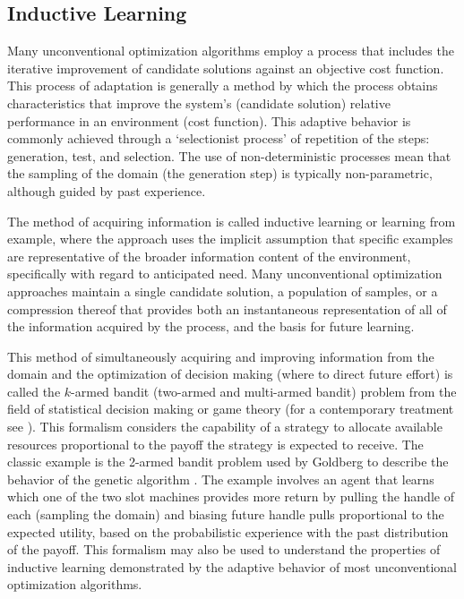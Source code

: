 \documentclass[a4paper, 11pt]{article}
\begin{document}
% 
% 
\subsection{Inductive Learning}
\label{subsec:induction}
Many unconventional optimization algorithms employ a process that includes the iterative improvement of candidate solutions against an objective cost function. This process of adaptation is generally a method by which the process obtains characteristics that improve the system's (candidate solution) relative performance in an environment (cost function). This adaptive behavior is commonly achieved through a `selectionist process' of repetition of the steps: generation, test, and selection. The use of non-deterministic processes mean that the sampling of the domain (the generation step) is typically non-parametric, although guided by past experience. 

The method of acquiring information is called inductive learning or learning from example, where the approach uses the implicit assumption that specific examples are representative of the broader information content of the environment, specifically with regard to anticipated need. Many unconventional optimization approaches maintain a single candidate solution, a population of samples, or a compression thereof that provides both an instantaneous representation of all of the information acquired by the process, and the basis for future learning. 

This method of simultaneously acquiring and improving information from the domain and the optimization of decision making (where to direct future effort) is called the $k$-armed bandit (two-armed and multi-armed bandit) problem from the field of statistical decision making or game theory \cite{Robbins1952} (for a contemporary treatment see \cite{Bergemann2006}). This formalism considers the capability of a strategy to allocate available resources proportional to the payoff the strategy is expected to receive. The classic example is the 2-armed bandit problem used by Goldberg to describe the behavior of the genetic algorithm \cite{Goldberg1989}. The example involves an agent that learns which one of the two slot machines provides more return by pulling the handle of each (sampling the domain) and biasing future handle pulls proportional to the expected utility, based on the probabilistic experience with the past distribution of the payoff. This formalism may also be used to understand the properties of inductive learning demonstrated by the adaptive behavior of most unconventional optimization algorithms.
\end{document}
